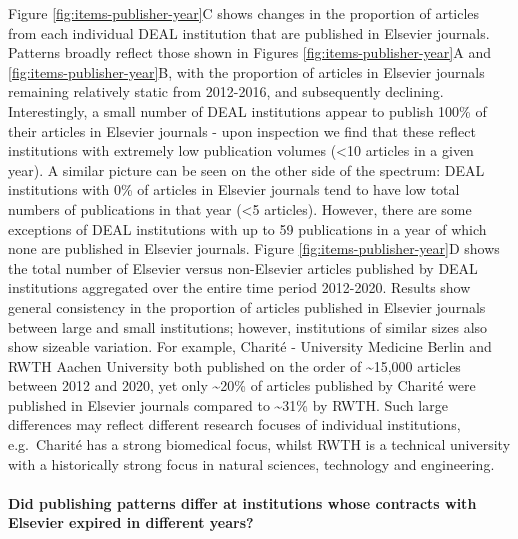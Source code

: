 \documentclass[
]{article}
\begin{document}
Figure \ref{fig:items-publisher-year}C shows changes in the proportion of articles from each individual DEAL institution that are published in Elsevier journals. Patterns broadly reflect those shown in Figures \ref{fig:items-publisher-year}A and \ref{fig:items-publisher-year}B, with the proportion of articles in Elsevier journals remaining relatively static from 2012-2016, and subsequently declining. Interestingly, a small number of DEAL institutions appear to publish 100\% of their articles in Elsevier journals - upon inspection we find that these reflect institutions with extremely low publication volumes (\textless10 articles in a given year). A similar picture can be seen on the other side of the spectrum: DEAL institutions with 0\% of articles in Elsevier journals tend to have low total numbers of publications in that year (\textless5 articles). However, there are some exceptions of DEAL institutions with up to 59 publications in a year of which none are published in Elsevier journals. Figure \ref{fig:items-publisher-year}D shows the total number of Elsevier versus non-Elsevier articles published by DEAL institutions aggregated over the entire time period 2012-2020. Results show general consistency in the proportion of articles published in Elsevier journals between large and small institutions; however, institutions of similar sizes also show sizeable variation. For example, Charité - University Medicine Berlin and RWTH Aachen University both published on the order of \textasciitilde15,000 articles between 2012 and 2020, yet only \textasciitilde20\% of articles published by Charité were published in Elsevier journals compared to \textasciitilde31\% by RWTH. Such large differences may reflect different research focuses of individual institutions, e.g.~Charité has a strong biomedical focus, whilst RWTH is a technical university with a historically strong focus in natural sciences, technology and engineering.

\hypertarget{did-publishing-patterns-differ-at-institutions-whose-contracts-with-elsevier-expired-in-different-years}{%
\paragraph{Did publishing patterns differ at institutions whose contracts with Elsevier expired in different years?}\label{did-publishing-patterns-differ-at-institutions-whose-contracts-with-elsevier-expired-in-different-years}}
\end{document}
